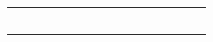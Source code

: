 \documentclass{article}
\begin{document}
\begin{tabularx}{\linewidth}{|c|>{\centering\arraybackslash}p{5em}|>{\centering\arraybackslash}p{9em}|*{11}{Y|}}
	                      &                       &                           &                                       &                                       &        &     &     &     &     &      &       &       &       \\ \hline
	                      &                       &                           &                                       &                                       &        &     &     &     &     &      &       &       &       \\ \hline
	                      &                       &                           &                                       &                                       &        &     &     &     &     &      &       &       &       \\ \hline
	                      &                       &                           &                                       &                                       &        &     &     &     &     &      &       &       &       \\ \hline
	                      &                       &                           &                                       &                                       &        &     &     &     &     &      &       &       &       \\ \hline
	                      &                       &                           &                                       &                                       &        &     &     &     &     &      &       &       &       \\ \hline
\end{tabularx}
\end{document}

